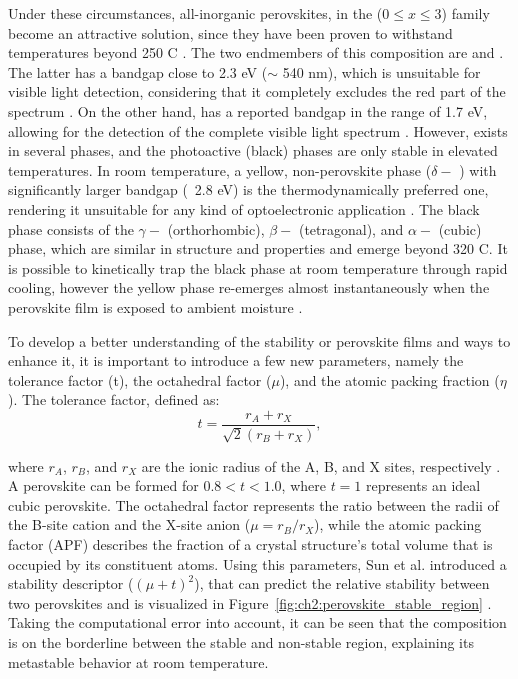 Under these circumstances, all-inorganic perovskites, in the  ($0 \le x \le 3$) family become an attractive solution, since they have been proven to withstand temperatures beyond 250 \degree C \cite{Dong2021High-TemperatureCells}. The two endmembers of this composition are  and . The latter has a bandgap close to 2.3 eV ($\sim$ 540 nm), which is unsuitable for visible light detection, considering that it completely excludes the red part of the spectrum \cite{Tong2020RecentCells}. On the other hand,  has a reported bandgap in the range of 1.7 eV, allowing for the detection of the complete visible light spectrum \cite{Zhao2018ThermodynamicallyPhotovoltaics}. However,  exists in several phases, and the photoactive (black) phases are only stable in elevated temperatures. In room temperature, a yellow, non-perovskite phase ($\delta-$ ) with significantly larger bandgap (~2.8 eV) is the thermodynamically preferred one, rendering it unsuitable for any kind of optoelectronic application \cite{Cho2021Long-termNetwork, Burwig2018CrystalFilms, Steele2022AnFilms}. The black phase consists of the $\gamma-$ (orthorhombic), $\beta-$ (tetragonal), and $\alpha-$ (cubic) phase, which are similar in structure and properties and emerge beyond 320 \degree C. It is possible to kinetically trap the black phase at room temperature through rapid cooling, however the yellow phase re-emerges almost instantaneously when the perovskite film is exposed to ambient moisture \cite{Steele2019ThermalFilms}. 

To develop a better understanding of the stability or perovskite films and ways to enhance it, it is important to introduce a few new parameters, namely the tolerance factor (t), the octahedral factor ($\mu$), and the atomic packing fraction ($\eta$). The tolerance factor, defined as:
\begin{equation}
    t = \frac{r_A + r_X}{\sqrt{2}(r_B + r_X)},
    \label{eq:tolerance_factor}
\end{equation} 

where $r_A$, $r_B$, and $r_X$ are the ionic radius of the A, B, and X sites, respectively \cite{Goldschmidt1926DieKrystallochemie}. A perovskite can be formed for $0.8 < t < 1.0$, where $t = 1$ represents an ideal cubic perovskite. The octahedral factor represents the ratio between the radii of the B-site cation and the X-site anion ($\mu = r_B/r_X$), while the atomic packing factor (APF) describes the fraction of a crystal structure's total volume that is occupied by its constituent atoms. Using this parameters, Sun et al. introduced a stability descriptor ($(\mu + t)^2$), that can predict the relative stability between two perovskites and is visualized in Figure~\ref{fig:ch2:perovskite_stable_region} \cite{Sun2017ThermodynamicPerovskites}. Taking the computational error into account, it can be seen that the  composition is on the borderline between the stable and non-stable region, explaining its metastable behavior at room temperature.  

